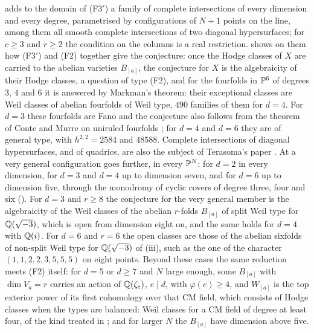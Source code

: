\begin{remark}
\label{rem:vandermonde}
 adds to the domain of \textup{(F3$'$)} a family of
complete intersections of every dimension and every degree, parametrised by
configurations of $N+1$ points on the line, among them all smooth complete intersections of two diagonal
hypersurfaces; for $c\ge3$ and $r\ge2$ the condition on the columns is a real
restriction.  shows on them how \textup{(F3$'$)} and
(F2) together give the conjecture: once the Hodge classes of $X$ are
carried to the abelian varieties $B_{[a]}$, the conjecture for $X$ is the
algebraicity of their Hodge classes, a question of type (F2), and for the
fourfolds in $\mathbb{P}^{6}$ of degrees $3$, $4$ and $6$ it is answered by
Markman's theorem: their exceptional classes are Weil classes of abelian
fourfolds of Weil type, $490$ families of them for $d=4$. For $d=3$ these
fourfolds are Fano and the conjecture also follows from the theorem of Conte
and Murre on uniruled fourfolds \cite{CM78}; for $d=4$ and $d=6$ they are of
general type, with $h^{2,2}=2584$ and $48588$. Complete intersections of
diagonal hypersurfaces, and of quadrics, are also the subject of Terasoma's
paper \cite{Ter88}. At a very general configuration
 goes further, in every $\mathbb{P}^{N}$: for $d=2$ in every
dimension, for $d=3$ and $d=4$ up to dimension seven, and for $d=6$ up to
dimension five, through the monodromy of cyclic covers of degree three, four
and six (). For $d=3$ and $r\ge8$ the
conjecture for the very general member is the algebraicity of the Weil
classes of the abelian $r$-folds $B_{[a]}$ of split Weil type for
$\mathbb{Q}(\sqrt{-3})$, which is open from dimension eight on, and the same holds
for $d=4$ with $\mathbb{Q}(i)$. For $d=6$ and $r=6$ the open classes are those of
the abelian sixfolds of non-split Weil type for $\mathbb{Q}(\sqrt{-3})$ of
(iii), such as the one of the character
$(1,1,2,2,3,5,5,5)$ on eight points. Beyond these cases the
same reduction meets (F2) itself: for $d=5$ or $d\ge7$ and $N$ large enough, some
$B_{[a]}$ with $\dim V_{a}=r$ carries an action of $\mathbb{Q}(\zeta_{e})$, $e\mid d$,
with $\varphi(e)\ge4$, and $W_{[a]}$ is the top exterior power of its first
cohomology over that CM field, which consists of Hodge classes when the
types are balanced: Weil classes for a CM field of degree at least four, of
the kind treated in ; and for larger $N$ the $B_{[a]}$ have
dimension above five.
\end{remark}

